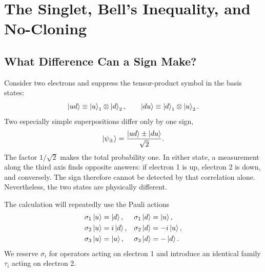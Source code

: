 \chapter{The Singlet, Bell's Inequality, and No-Cloning}


\section{What Difference Can a Sign Make?}

Consider two electrons and suppress the tensor-product symbol in the basis states:
\begin{equation}
  \left\lvert ud\right\rangle\equiv\left\lvert u\right\rangle_1\otimes\left\lvert d\right\rangle_2,
  \qquad
  \left\lvert du\right\rangle\equiv\left\lvert d\right\rangle_1\otimes\left\lvert u\right\rangle_2.
\end{equation}
Two especially simple superpositions differ only by one sign,
\begin{equation}
  \left\lvert\psi_\pm\right\rangle
  =
  \frac{\left\lvert ud\right\rangle\pm\left\lvert du\right\rangle}{\sqrt2}.
  \label{eq:l05-two-signs}
\end{equation}
The factor \(1/\sqrt2\) makes the total probability one. In either state, a measurement along the third axis finds opposite answers: if electron 1 is up, electron 2 is down, and conversely. The sign therefore cannot be detected by that correlation alone. Nevertheless, the two states are physically different.

The calculation will repeatedly use the Pauli actions
\begin{align}
  \sigma_1\left\lvert u\right\rangle&=\left\lvert d\right\rangle,&
  \sigma_1\left\lvert d\right\rangle&=\left\lvert u\right\rangle,\nonumber\\
  \sigma_2\left\lvert u\right\rangle&=i\left\lvert d\right\rangle,&
  \sigma_2\left\lvert d\right\rangle&=-i\left\lvert u\right\rangle,\nonumber\\
  \sigma_3\left\lvert u\right\rangle&=\left\lvert u\right\rangle,&
  \sigma_3\left\lvert d\right\rangle&=-\left\lvert d\right\rangle.
  \label{eq:l05-pauli-actions}
\end{align}
We reserve \(\sigma_i\) for operators acting on electron 1 and introduce an identical family \(\tau_i\) acting on electron 2.

